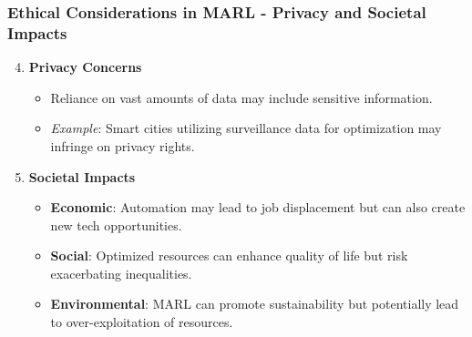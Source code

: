 \documentclass[aspectratio=169]{beamer}
\begin{document}
\begin{frame}[fragile]
  \frametitle{Ethical Considerations in MARL - Privacy and Societal Impacts}
  \begin{enumerate}
    \setcounter{enumi}{3} %
    \item \textbf{Privacy Concerns}
      \begin{itemize}
        \item Reliance on vast amounts of data may include sensitive information.
        \item \textit{Example}: Smart cities utilizing surveillance data for optimization may infringe on privacy rights.
      \end{itemize}

    \item \textbf{Societal Impacts}
      \begin{itemize}
        \item \textbf{Economic}: Automation may lead to job displacement but can also create new tech opportunities.
        \item \textbf{Social}: Optimized resources can enhance quality of life but risk exacerbating inequalities.
        \item \textbf{Environmental}: MARL can promote sustainability but potentially lead to over-exploitation of resources.
      \end{itemize}
  \end{enumerate}
\end{frame}
\end{document}
